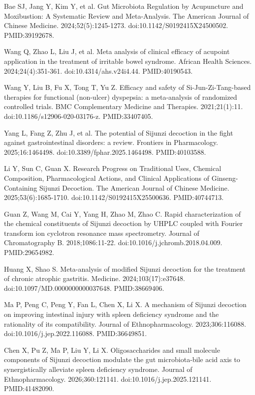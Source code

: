 \documentclass[12pt,oneside]{book}
\newcommand{\reff}[2]{\par\hangindent=7mm\hangafter=1\noindent[#1]\hspace{2mm}#2\par}
\begin{document}
\reff{45}{Bae SJ, Jang Y, Kim Y, et al. Gut Microbiota Regulation by Acupuncture and Moxibustion: A Systematic Review and Meta-Analysis. The American Journal of Chinese Medicine. 2024;52(5):1245-1273. doi:10.1142/S0192415X24500502. PMID:39192678.}

\reff{46}{Wang Q, Zhao L, Liu J, et al. Meta analysis of clinical efficacy of acupoint application in the treatment of irritable bowel syndrome. African Health Sciences. 2024;24(4):351-361. doi:10.4314/ahs.v24i4.44. PMID:40190543.}

\reff{47}{Wang Y, Liu B, Fu X, Tong T, Yu Z. Efficacy and safety of Si-Jun-Zi-Tang-based therapies for functional (non-ulcer) dyspepsia: a meta-analysis of randomized controlled trials. BMC Complementary Medicine and Therapies. 2021;21(1):11. doi:10.1186/s12906-020-03176-z. PMID:33407405.}

\reff{48}{Yang L, Fang Z, Zhu J, et al. The potential of Sijunzi decoction in the fight against gastrointestinal disorders: a review. Frontiers in Pharmacology. 2025;16:1464498. doi:10.3389/fphar.2025.1464498. PMID:40103588.}

\reff{49}{Li Y, Sun C, Guan X. Research Progress on Traditional Uses, Chemical Composition, Pharmacological Actions, and Clinical Applications of Ginseng-Containing Sijunzi Decoction. The American Journal of Chinese Medicine. 2025;53(6):1685-1710. doi:10.1142/S0192415X25500636. PMID:40744713.}

\reff{50}{Guan Z, Wang M, Cai Y, Yang H, Zhao M, Zhao C. Rapid characterization of the chemical constituents of Sijunzi decoction by UHPLC coupled with Fourier transform ion cyclotron resonance mass spectrometry. Journal of Chromatography B. 2018;1086:11-22. doi:10.1016/j.jchromb.2018.04.009. PMID:29654982.}

\reff{51}{Huang X, Shao S. Meta-analysis of modified Sijunzi decoction for the treatment of chronic atrophic gastritis. Medicine. 2024;103(17):e37648. doi:10.1097/MD.0000000000037648. PMID:38669406.}

\reff{52}{Ma P, Peng C, Peng Y, Fan L, Chen X, Li X. A mechanism of Sijunzi decoction on improving intestinal injury with spleen deficiency syndrome and the rationality of its compatibility. Journal of Ethnopharmacology. 2023;306:116088. doi:10.1016/j.jep.2022.116088. PMID:36649851.}

\reff{53}{Chen X, Pu Z, Ma P, Liu Y, Li X. Oligosaccharides and small molecule components of Sijunzi decoction modulate the gut microbiota-bile acid axis to synergistically alleviate spleen deficiency syndrome. Journal of Ethnopharmacology. 2026;360:121141. doi:10.1016/j.jep.2025.121141. PMID:41482090.}
\end{document}
